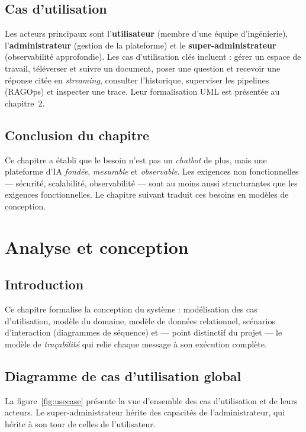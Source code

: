 \documentclass[12pt,a4paper,oneside]{report}
\begin{document}
\section{Cas d'utilisation}
Les acteurs principaux sont l'\textbf{utilisateur} (membre d'une équipe
d'ingénierie), l'\textbf{administrateur} (gestion de la plateforme) et le
\textbf{super-administrateur} (observabilité approfondie). Les cas d'utilisation
clés incluent : gérer un espace de travail, téléverser et suivre un document,
poser une question et recevoir une réponse citée en \emph{streaming}, consulter
l'historique, superviser les pipelines (RAGOps) et inspecter une trace. Leur
formalisation UML est présentée au chapitre~2.

\section{Conclusion du chapitre}
Ce chapitre a établi que le besoin n'est pas un \emph{chatbot} de plus, mais une
plateforme d'IA \emph{fondée}, \emph{mesurable} et \emph{observable}. Les exigences
non fonctionnelles — sécurité, scalabilité, observabilité — sont au moins aussi
structurantes que les exigences fonctionnelles. Le chapitre suivant traduit ces
besoins en modèles de conception.

\chapter{Analyse et conception}
\label{chap:conception}

\section{Introduction}
Ce chapitre formalise la conception du système : modélisation des cas
d'utilisation, modèle du domaine, modèle de données relationnel, scénarios
d'interaction (diagrammes de séquence) et — point distinctif du projet — le
modèle de \emph{traçabilité} qui relie chaque message à son exécution complète.

\section{Diagramme de cas d'utilisation global}
La figure~\ref{fig:usecase} présente la vue d'ensemble des cas d'utilisation et
de leurs acteurs. Le super-administrateur hérite des capacités de
l'administrateur, qui hérite à son tour de celles de l'utilisateur.
\end{document}
